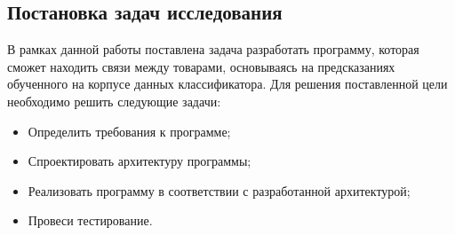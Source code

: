 \subsection{Постановка задач исследования}
В рамках данной работы поставлена задача разработать программу, которая сможет находить связи между товарами, основываясь на предсказаниях обученного на корпусе данных классификатора.
Для решения поставленной цели необходимо решить следующие задачи:
\begin{itemize}
  \item Определить требования к программе;
  \item Спроектировать архитектуру программы;
  \item Реализовать программу в соответствии с разработанной архитектурой;
  \item Провеси тестирование.
\end{itemize}
\newpage
